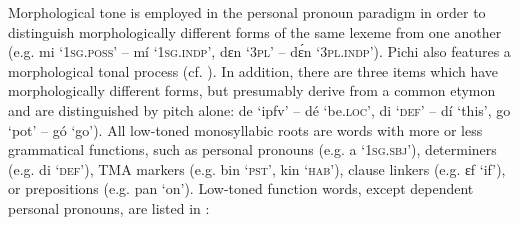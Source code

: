 Morphological tone is employed in the personal pronoun paradigm in order to distinguish morphologically different forms of the same lexeme from one another (e.g. mi \textsc{‘1sg.poss’} – mí \textsc{‘1sg.indp’}, dɛn ‘\textsc{3pl}’ – dɛ́n ‘\textsc{3pl.indp}’). Pichi also features a morphological tonal process (cf. ). In addition, there are three items which have morphologically different forms, but presumably derive from a common etymon and are distinguished by pitch alone: de ‘ipfv’ – dé ‘be.\textsc{loc}’, di \textsc{‘def’} – dí ‘this’, go ‘pot’ – gó ‘go’). All low-toned monosyllabic roots are words with more or less grammatical functions, such as personal pronouns (e.g. a ‘\textsc{1sg.sbj}’), determiners (e.g. di ‘\textsc{def}’), TMA markers (e.g. bin ‘\textsc{pst}’, kin ‘\textsc{hab}’), clause linkers (e.g. ɛf ‘if’), or prepositions (e.g. pan ‘on’). Low-toned function words, except dependent personal pronouns, are listed in :

